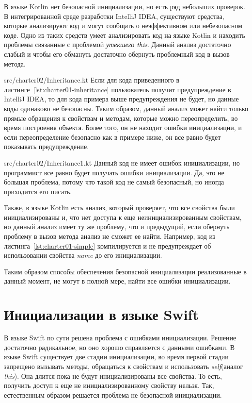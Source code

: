 В языке Kotlin нет безопасной инициализации, но есть ряд небольших проверок.
В интегрированной среде разработки IntelliJ IDEA, существуют средства,
которые анализируют код и могут сообщать о неэффективном или небезопасном коде.
Одно из таких средств умеет анализировать код на языке Kotlin и находить проблемы связанные с проблемой \textit{утекшего this}.
Данный анализ достаточно слабый и чтобы его обмануть достаточно обернуть проблемный код в вызов метода.

{src/charter02/Inheritance.kt}
Если для кода приведенного в листинге~\ref{lst:charter01-inheritance} пользователь получит предупреждение в IntelliJ IDEA,
то для кода примера выше предупреждения не будет, но данные коды одинаково не безопасны.
Таким образом, данный анализ может найти только прямые обращения к свойствам и методам, которые можно переопределить,
во время построения объекта.
Более того, он не находит ошибки инициализации, и если переопределение безопасно как в примере ниже,
он все равно будет показывать предупреждение.

{src/charter02/Inheritance1.kt}
Данный код не имеет ошибок инициализации, но программист все равно будет получать ошибки инициализации.
Да, это не большая проблема, потому что такой код не самый безопасный, но иногда приходится его писать.

Также, в языке Kotlin есть анализ, который проверяет, что все свойства были инициализированы и,
что нет доступа к еще неинициализированным свойствам, но данный анализ имеет ту же проблему, что и предыдущий,
если обернуть проблему в вызов метода анализ не сможет ее найти.
Например, код из листинга~\ref{lst:charter01-simple} компилируется и не предупреждает об использовании свойства \emph{name}
до его инициализации.

Таким образом способы обеспечения безопасной инициализации реализованные в данный момент, не могут в полной мере,
найти все ошибки инициализации.


\section{Инициализации в языке Swift}\label{sec:инициализации-в-языке-swift}

В языке Swift по сути решена проблема с ошибками инициализации.
Решение достаточно радикальное, но оно хорошо справляется с данными ошибками.
В языке Swift существует две стадии инициализации, во время первой стадии запрещено вызывать методы,
обращаться к свойствам и использовать \emph{self}(аналог \emph{this}).
Она длится пока не будут инициализированы все свойства.
То есть, получить доступ к еще не инициализированному свойству нельзя.
Так, естественным образом решается проблема не безопасной инициализации.

